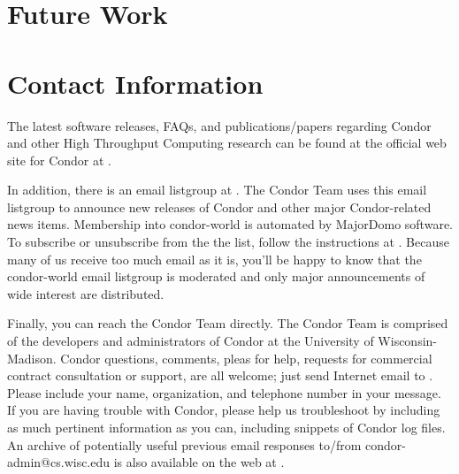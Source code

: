 \section{Future Work}
\Todo

\section{Contact Information}
\label{contact-info}

The latest software releases, FAQs, and publications/papers regarding Condor and other High 
Throughput Computing research can be found at the official web site for Condor at  
.

In addition, there is an email listgroup at .  The Condor Team 
uses this email listgroup to announce new releases of Condor and other major Condor-related 
news items.  Membership into condor-world is automated by MajorDomo software.  To 
subscribe or unsubscribe from the the list, follow the instructions at  
.  Because many of us receive 
too much email as it is, you'll be happy to know that the condor-world email listgroup is 
moderated and only major announcements of wide interest are distributed.

Finally, you can reach the Condor Team directly.  The Condor Team is comprised of the 
developers and administrators of Condor at the University of Wisconsin-Madison. Condor 
questions, comments, pleas for help, requests for commercial contract consultation or support, 
are all welcome; just send Internet email to .  Please include your 
name, organization, and telephone number in your message.  If you are having trouble with 
Condor, please help us troubleshoot by including as much pertinent information as you can, 
including snippets of Condor log files.  An archive of potentially useful previous email responses 
to/from condor-admin@cs.wisc.edu is also available on the web at  
.



